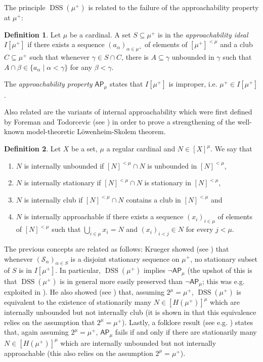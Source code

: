 \documentclass[12pt]{amsart}
\theoremstyle{definition}
\newtheorem{mydef}{Definition}[section]
\theoremstyle{remark}
\theoremstyle{plain}
\numberwithin{mydef}{section}
\DeclareMathOperator{\DSS}{DSS}
\newcommand{\AP}{\mathsf{AP}}
\begin{document}
	The principle $\DSS(\mu^+)$ is related to the failure of the approachability property at $\mu^+$:
	
	\begin{mydef}
		Let $\mu$ be a cardinal. A set $S\subseteq\mu^+$ is in the \emph{approachability ideal $I[\mu^+]$} if there exists a sequence $(a_{\alpha})_{\alpha\in\mu^+}$ of elements of $[\mu^+]^{<\mu}$ and a club $C\subseteq\mu^+$ such that whenever $\gamma\in S\cap C$, there is $A\subseteq\gamma$ unbounded in $\gamma$ such that $A\cap\beta\in\{a_{\alpha}\;|\;\alpha<\gamma\}$ for any $\beta<\gamma$.
		
		The \emph{approachability property} $\AP_{\mu}$ states that $I[\mu^+]$ is improper, i.e. $\mu^+\in I[\mu^+]$.
	\end{mydef}
	
	Also related are the variants of internal approachability which were first defined by Foreman and Todorcevic (see \cite{ForemanTodorLowenheimSkolem}) in order to prove a strengthening of the well-known model-theoretic Löwenheim-Skolem theorem.
	
	\begin{mydef}
		Let $X$ be a set, $\mu$ a regular cardinal and $N\in[X]^{\mu}$. We say that
		\begin{enumerate}
			\item $N$ is internally unbounded if $[N]^{<\mu}\cap N$ is unbounded in $[N]^{<\mu}$,
			\item $N$ is internally stationary if $[N]^{<\mu}\cap N$ is stationary in $[N]^{<\mu}$,
			\item $N$ is internally club if $[N]^{<\mu}\cap N$ contains a club in $[N]^{<\mu}$ and
			\item $N$ is internally approachable if there exists a sequence $(x_i)_{i\in\mu}$ of elements of $[N]^{<\mu}$ such that $\bigcup_{i\in\mu}x_i=N$ and $(x_i)_{i<j}\in N$ for every $j<\mu$.
		\end{enumerate}
	\end{mydef}
	
	The previous concepts are related as follows: Krueger showed (see \cite[Corollary 3.7]{KruegerApplicMSI}) that whenever $(\mathcal{S}_{\alpha})_{\alpha\in S}$ is a disjoint stationary sequence on $\mu^+$, no stationary subset of $S$ is in $I[\mu^+]$. In particular, $\DSS(\mu^+)$ implies $\neg\AP_{\mu}$ (the upshot of this is that $\DSS(\mu^+)$ is in general more easily preserved than $\neg\AP_{\mu}$; this was e.g. exploited in \cite[Theorem 5.1]{HonzikStejskalovaCardInvariant}). He also showed (see \cite[Theorem 6.5]{KruegerApplicMSI}) that, assuming $2^{\mu}=\mu^+$, $\DSS(\mu^+)$ is equivalent to the existence of stationarily many $N\in[H(\mu^+)]^{\mu}$ which are internally unbounded but not internally club (it is shown in \cite{JakobCascadingVariants} that this equivalence relies on the assumption that $2^{\mu}=\mu^+$). Lastly, a folklore result (see e.g. \cite[Lemma 1]{CoxFAAppSSR}) states that, again assuming $2^{\mu}=\mu^+$, $\AP_{\mu}$ fails if and only if there are stationarily many $N\in[H(\mu^+)]^{\mu}$ which are internally unbounded but not internally approachable (this also relies on the assumption $2^{\mu}=\mu^+$).
	
\end{document}
